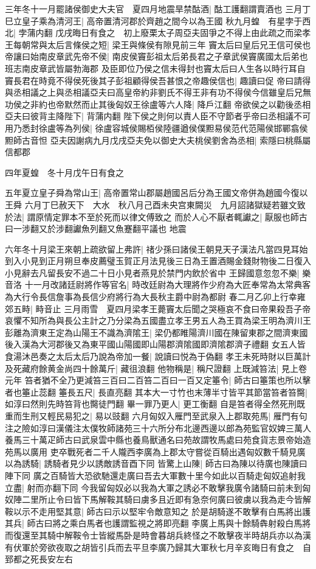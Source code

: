 三年冬十一月罷諸侯御史大夫官　夏四月地震旱禁酤酒|{
	酤工護翻謂賣酒也}
三月丁巳立皇子乘為清河王|{
	高帝置清河郡於齊趙之間今以為王國}
秋九月蝗　有星孛于西北|{
	孛蒲内翻}
戊戌晦日有食之　初上廢栗太子周亞夫固爭之不得上由此疏之而梁孝王每朝常與太后言條侯之短|{
	梁王與條侯有隙見前三年}
竇太后曰皇后兄王信可侯也帝讓曰始南皮章武先帝不侯|{
	南皮侯竇彭祖太后弟長君之子章武侯竇廣國太后弟也班志南皮章武皆屬勃海郡}
及臣即位乃侯之信未得封也竇太后曰人生各以時行耳自竇長君在時竟不得侯死後其子彭祖顧得侯吾甚恨之帝趣侯信也|{
	趣讀曰促}
帝曰請得與丞相議之上與丞相議亞夫曰高皇帝約非劉氏不得王非有功不得侯今信雖皇后兄無功侯之非約也帝默然而止其後匈奴王徐盧等六人降|{
	降戶江翻}
帝欲侯之以勸後丞相亞夫曰彼背主降陛下|{
	背蒲内翻}
陛下侯之則何以責人臣不守節者乎帝曰丞相議不可用乃悉封徐盧等為列侯|{
	徐盧容城侯賜栢侯陸疆遒侯僕䵣易侯范代范陽侯邯鄲翕侯䵣師古音怛}
亞夫因謝病九月戊戌亞夫免以御史大夫桃侯劉舍為丞相|{
	索隱曰桃縣屬信都郡}


四年夏蝗　冬十月戊午日有食之

五年夏立皇子舜為常山王|{
	高帝置常山郡屬趙國呂后分為王國文帝併為趙國今復以王舜}
六月丁巳赦天下　大水　秋八月己酉未央宫東闕災　九月詔諸獄疑若雖文致於法|{
	謂原情定罪本不至於死而以律文傅致之}
而於人心不厭者輒讞之|{
	厭服也師古曰一涉翻又於涉翻讞魚列翻又魚蹇翻平議也}
地震

六年冬十月梁王來朝上疏欲留上弗許|{
	禇少孫曰諸侯王朝見天子漢法凡當四見耳始到入小見到正月朔旦奉皮薦璧玉賀正月法見後三日為王置酒賜金錢財物後二日復入小見辭去凡留長安不過二十日小見者燕見於禁門内飲於省中}
王歸國意忽忽不樂|{
	樂音洛}
十一月改諸廷尉將作等官名|{
	時改廷尉為大理將作少府為大匠奉常為太常典客為大行令長信詹事為長信少府將行為大長秋主爵中尉為都尉}
春二月乙卯上行幸雍郊五畤|{
	畤音止}
三月雨雪　夏四月梁孝王薨竇太后聞之哭極哀不食曰帝果殺吾子帝哀懼不知所為與長公主計之乃分梁為五國盡立孝王男五人為王買為梁王明為濟川王彭離為濟東王定為山陽王不識為濟隂王|{
	梁仍都睢陽濟川國在陳留東郡之間濟東國後入漢為大河郡後又為東平國山陽國即山陽郡濟隂國即濟隂郡濟子禮翻}
女五人皆食湯沐邑奏之太后太后乃說為帝加一餐|{
	說讀曰悦為于偽翻}
孝王未死時財以巨萬計及死藏府餘黄金尚四十餘萬斤|{
	藏徂浪翻}
他物稱是|{
	稱尺證翻}
上既減笞法|{
	見上卷元年}
笞者猶不全乃更減笞三百曰二百笞二百曰一百又定箠令|{
	師古曰箠策也所以擊者也箠止蕊翻}
箠長五尺|{
	長直亮翻}
其本大一寸竹也末薄半寸皆平其節當笞者笞臋|{
	如淳曰然則先時笞背也臋徒門翻}
畢一罪乃更人|{
	更工衡翻}
自是笞者得全然死刑既重而生刑又輕民易犯之|{
	易以豉翻}
六月匈奴入雁門至武泉入上郡取苑馬|{
	雁門有句注之險如淳曰漢儀注太僕牧師諸苑三十六所分布北邊西邊以郎為苑監官奴婢三萬人養馬三十萬疋師古曰武泉雲中縣也養鳥獸通名曰苑故謂牧馬處曰苑食貨志景帝始造苑馬以廣用}
吏卒戰死者二千人隴西李廣為上郡太守嘗從百騎出遇匈奴數千騎見廣以為誘騎|{
	誘騎者見少以誘敵誘音酉下同}
皆驚上山陳|{
	師古曰為陳以待廣也陳讀曰陣下同}
廣之百騎皆大恐欲馳還走廣曰吾去大軍數十里今如此以百騎走匈奴追射我立盡|{
	射而亦翻下同}
今我留匈奴必以我為大軍之誘必不敢擊我廣令諸騎曰前未到匈奴陣二里所止令曰皆下馬解鞍其騎曰虜多且近即有急奈何廣曰彼虜以我為走今皆解鞍以示不走用堅其意|{
	師古曰示以堅牢令敵意知之}
於是胡騎遂不敢擊有白馬將出護其兵|{
	師古曰將之乘白馬者也護謂監視之將即亮翻}
李廣上馬與十餘騎犇射殺白馬將而復還至其騎中解鞍令士皆縱馬卧是時會暮胡兵終怪之不敢擊夜半時胡兵亦以為漢有伏軍於旁欲夜取之胡皆引兵而去平旦李廣乃歸其大軍秋七月辛亥晦日有食之　自郅都之死長安左右

